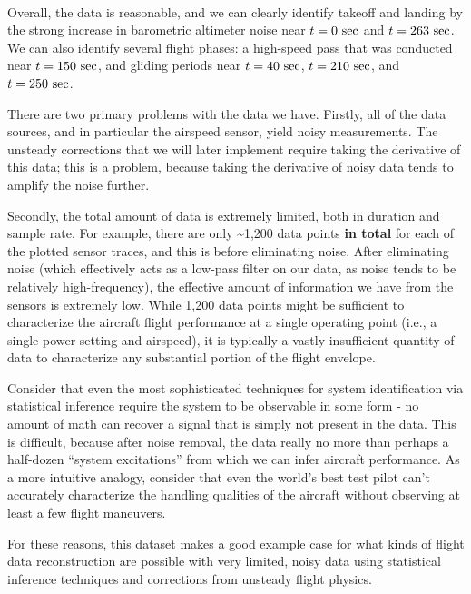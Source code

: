 \documentclass[11pt]{article}
\begin{document}
    \begin{center}
    \end{center}
    { \hspace*{\fill} \\}
    
    Overall, the data is reasonable, and we can clearly identify takeoff and
landing by the strong increase in barometric altimeter noise near
\(t=0\ \rm sec\) and \(t=263\ \rm sec\). We can also identify several
flight phases: a high-speed pass that was conducted near
\(t=150\ \rm sec\), and gliding periods near \(t=40\ \rm sec\),
\(t=210\ \rm sec\), and \(t=250\ \rm sec\).

There are two primary problems with the data we have. Firstly, all of
the data sources, and in particular the airspeed sensor, yield noisy
measurements. The unsteady corrections that we will later implement
require taking the derivative of this data; this is a problem, because
taking the derivative of noisy data tends to amplify the noise further.

Secondly, the total amount of data is extremely limited, both in
duration and sample rate. For example, there are only
\textasciitilde1,200 data points \textbf{in total} for each of the
plotted sensor traces, and this is before eliminating noise. After
eliminating noise (which effectively acts as a low-pass filter on our
data, as noise tends to be relatively high-frequency), the effective
amount of information we have from the sensors is extremely low. While
1,200 data points might be sufficient to characterize the aircraft
flight performance at a single operating point (i.e., a single power
setting and airspeed), it is typically a vastly insufficient quantity of
data to characterize any substantial portion of the flight envelope.

Consider that even the most sophisticated techniques for system
identification via statistical inference require the system to be
observable in some form - no amount of math can recover a signal that is
simply not present in the data. This is difficult, because after noise
removal, the data really no more than perhaps a half-dozen ``system
excitations'' from which we can infer aircraft performance. As a more
intuitive analogy, consider that even the world's best test pilot can't
accurately characterize the handling qualities of the aircraft without
observing at least a few flight maneuvers.

    For these reasons, this dataset makes a good example case for what kinds
of flight data reconstruction are possible with very limited, noisy data
using statistical inference techniques and corrections from unsteady
flight physics.
\end{document}
